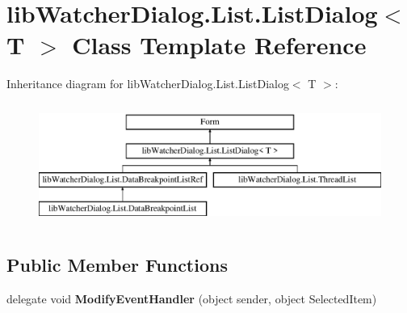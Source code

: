 \hypertarget{classlib_watcher_dialog_1_1_list_1_1_list_dialog_3_01_t_01_4}{\section{lib\+Watcher\+Dialog.\+List.\+List\+Dialog$<$ T $>$ Class Template Reference}
\label{classlib_watcher_dialog_1_1_list_1_1_list_dialog_3_01_t_01_4}
}
Inheritance diagram for lib\+Watcher\+Dialog.\+List.\+List\+Dialog$<$ T $>$\+:\begin{figure}[H]
\begin{center}
\leavevmode
\includegraphics[height=4.000000cm]{classlib_watcher_dialog_1_1_list_1_1_list_dialog_3_01_t_01_4}
\end{center}
\end{figure}
\subsection*{Public Member Functions}
\begin{DoxyCompactItemize}
\item 
\hypertarget{classlib_watcher_dialog_1_1_list_1_1_list_dialog_3_01_t_01_4_ab4454b184fa88ad49ef6d46820f397d6}{delegate void {\bfseries Modify\+Event\+Handler} (object sender, object Selected\+Item)}\label{classlib_watcher_dialog_1_1_list_1_1_list_dialog_3_01_t_01_4_ab4454b184fa88ad49ef6d46820f397d6}

\end{DoxyCompactItemize}
